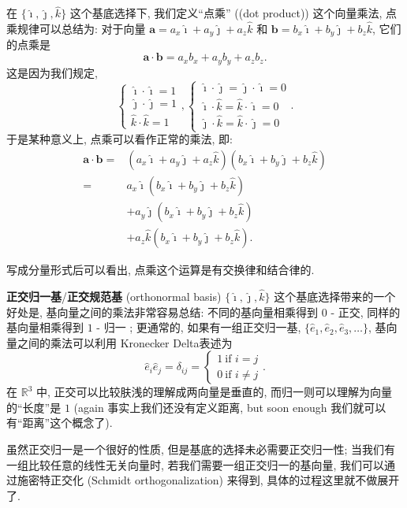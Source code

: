 在 $\{\hat{\imath},\hat{\jmath},\hat{k}\}$ 这个基底选择下, 我们定义``点乘'' ((dot product)) 这个向量乘法, 点乘规律可以总结为: 对于向量
$\boldsymbol{a}=a_x\hat{\imath}+a_y\hat{\jmath}+a_z\hat{k}$ 和
$\boldsymbol{b}=b_x\hat{\imath}+b_y\hat{\jmath}+b_z\hat{k}$,
它们的点乘是 \[
\boxed{\boldsymbol{a}\cdot\boldsymbol{b}=a_xb_x+a_yb_y+a_zb_z}.
\] 这是因为我们规定, \[
\begin{cases}
\hat{\imath}\cdot\hat{\imath}=1\\
\hat{\jmath}\cdot\hat{\jmath}=1\\
\hat{k}\cdot\hat{k}=1
\end{cases},
\begin{cases}
\hat{\imath}\cdot\hat{\jmath}=\hat{\jmath}\cdot\hat{\imath}=0\\
\hat{\imath}\cdot\hat{k}=\hat{k}\cdot\hat{\imath}=0\\
\hat{\jmath}\cdot\hat{k}=\hat{k}\cdot\hat{\jmath}=0
\end{cases}.
\] 于是某种意义上, 点乘可以看作正常的乘法, 即: 
\begin{align*}
\boldsymbol{a}\cdot\boldsymbol{b}=&(a_x\hat{\imath}+a_y\hat{\jmath}+a_z\hat{k})(b_x\hat{\imath}+b_y\hat{\jmath}+b_z\hat{k})\\
=&a_x\hat{\imath}(b_x\hat{\imath}+{b_y\hat{\jmath}+b_z\hat{k}})\\
&+a_y\hat{\jmath}({b_x\hat{\imath}}+b_y\hat{\jmath}+{b_z\hat{k}})\\
&+a_z\hat{k}({b_x\hat{\imath}+b_y\hat{\jmath}}+b_z\hat{k}).
\end{align*}

写成分量形式后可以看出, 点乘这个运算是有交换律和结合律的.

\begin{newquote}
\textbf{正交归一基}/\textbf{正交规范基} (orthonormal basis)
$\{\hat{\imath},\hat{\jmath},\hat{k}\}$ 这个基底选择带来的一个好处是,
基向量之间的乘法非常容易总结: 不同的基向量相乘得到 $0$ - 正交,
同样的基向量相乘得到 $1$ - 归一 ; 更通常的, 如果有一组正交归一基,
$\{\hat{e}_1,\hat{e}_2,\hat{e}_3,…\}$, 基向量之间的乘法可以利用
Kronecker Delta表述为 \[
\hat{e}_i\hat{e}_j=\delta_{ij}=\begin{cases}1\ \text{if }i=j\\0\ \text{if }i\neq j\end{cases}.
\] 在 $\mathbb{R}^3$ 中, 正交可以比较肤浅的理解成两向量是垂直的,
而归一则可以理解为向量的``长度''是 $1$ (again
事实上我们还没有定义距离, but soon enough
我们就可以有``距离''这个概念了).

虽然正交归一是一个很好的性质, 但是基底的选择未必需要正交归一性; 当我们有一组比较任意的线性无关向量时, 若我们需要一组正交归一的基向量, 我们可以通过施密特正交化 (Schmidt orthogonalization) 来得到, 具体的过程这里就不做展开了.
\end{newquote}

